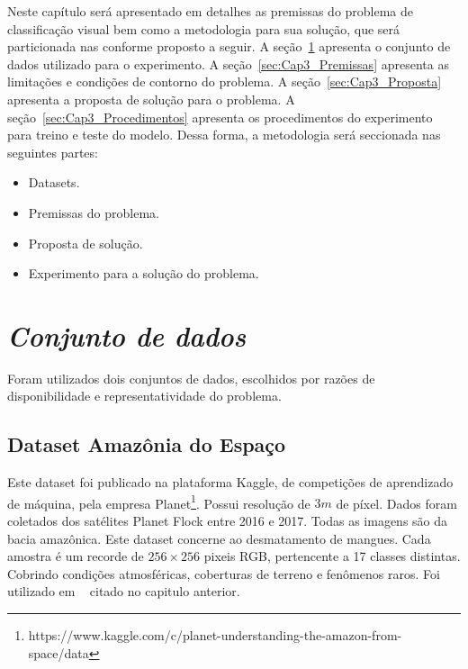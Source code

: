 Neste capítulo será apresentado em detalhes as premissas do problema de classificação visual bem como a metodologia para sua solução, que será particionada nas conforme proposto a seguir. A seção~\ref{sec:Cap3_Dataset} apresenta o conjunto de dados utilizado para o experimento.  A seção~\ref{sec:Cap3_Premissas} apresenta as limitações e condições de contorno do problema. A seção~\ref{sec:Cap3_Proposta} apresenta a proposta de solução para o problema. A seção~\ref{sec:Cap3_Procedimentos} apresenta os procedimentos do experimento para treino e teste do modelo. Dessa forma, a metodologia será seccionada nas seguintes partes:

\begin{itemize}
    \item  Datasets.
    \item  Premissas do problema.
    \item  Proposta de solução.
    \item  Experimento para a solução do problema.

\end{itemize}


\section{\textit{Conjunto de dados}}\label{sec:Cap3_Dataset}
Foram utilizados dois conjuntos de dados, escolhidos por razões de disponibilidade e representatividade do problema. 


\subsection{Dataset Amazônia do Espaço}\label{sec:Cap3_Amazon_dataset}

Este dataset foi publicado na plataforma Kaggle, de competições de aprendizado de máquina, pela empresa Planet\footnote{https://www.kaggle.com/c/planet-understanding-the-amazon-from-space/data}. Possui resolução de $3 m$ de píxel. Dados foram coletados dos satélites Planet Flock entre 2016 e 2017. Todas as imagens são da bacia amazônica. Este dataset concerne ao desmatamento de mangues. Cada amostra é um recorde de $256 \times 256$ pixeis RGB, pertencente a 17 classes distintas. Cobrindo condições atmosféricas, coberturas de terreno e fenômenos raros. Foi utilizado em ~\cite{9701667} citado no capitulo anterior.

